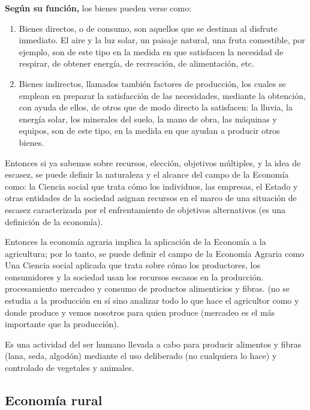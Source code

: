 \documentclass[
  a4paper,
]{article}
\begin{document}
\textbf{Según su función,} los bienes pueden verse como:

\begin{enumerate}
\def\labelenumi{\arabic{enumi}.}
\item
  Bienes directos, o de consumo, son aquellos que se destinan al
  disfrute inmediato. El aire y la luz solar, un paisaje natural, una
  fruta comestible, por ejemplo, son de este tipo en la medida en que
  satisfacen la necesidad de respirar, de obtener energía, de
  recreación, de alimentación, etc.
\item
  Bienes indirectos, llamados también factores de producción, los cuales
  se emplean en preparar la satisfacción de las necesidades, mediante la
  obtención, con ayuda de ellos, de otros que de modo directo la
  satisfacen: la lluvia, la energía solar, los minerales del suelo, la
  mano de obra, las máquinas y equipos, son de este tipo, en la medida
  en que ayudan a producir otros bienes.
\end{enumerate}

Entonces si ya sabemos sobre recursos, elección, objetivos múltiples, y
la idea de escasez, se puede definir la naturaleza y el alcance del
campo de la Economía como: la Ciencia social que trata cómo los
individuos, las empresas, el Estado y otras entidades de la sociedad
asignan recursos en el marco de una situación de escasez caracterizada
por el enfrentamiento de objetivos alternativos (es una definición de la
economía).

Entonces la economía agraria implica la aplicación de la Economía a la
agricultura; por lo tanto, se puede definir el campo de la Economía
Agraria como Una Ciencia social aplicada que trata sobre cómo los
productores, los consumidores y la sociedad usan los recursos escasos en
la producción. procesamiento mercadeo y consumo de productos
alimenticios y fibras. (no se estudia a la producción en sí sino
analizar todo lo que hace el agricultor como y donde produce y vemos
nosotros para quien produce (mercadeo es el más importante que la
producción).

Es una actividad del ser humano llevada a cabo para producir alimentos y
fibras (lana, seda, algodón) mediante el uso deliberado (no cualquiera
lo hace) y controlado de vegetales y animales.

\hypertarget{economuxeda-rural}{%
\subsection{Economía rural}\label{economuxeda-rural}}
\end{document}

